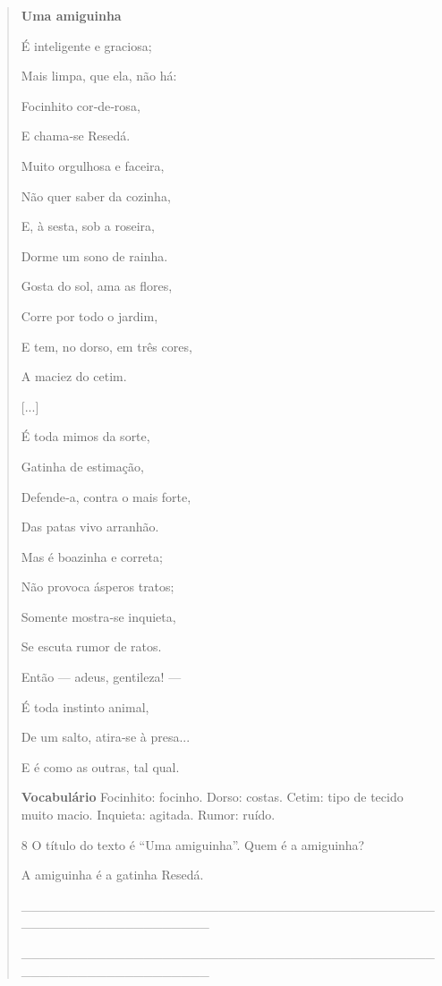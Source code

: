 \begin{boxlist}
{{\begin{quote}
\textbf{Uma amiguinha}

É inteligente e graciosa;

Mais limpa, que ela, não há:

Focinhito cor‑de‑rosa,

E chama‑se Resedá.


Muito orgulhosa e faceira,

Não quer saber da cozinha,

E, à sesta, sob a roseira,

Dorme um sono de rainha.


Gosta do sol, ama as flores,

Corre por todo o jardim,

E tem, no dorso, em três cores,

A maciez do cetim.


{[}...{]}


É toda mimos da sorte,

Gatinha de estimação,

Defende‑a, contra o mais forte,

Das patas vivo arranhão.


Mas é boazinha e correta;

Não provoca ásperos tratos;

Somente mostra‑se inquieta,

Se escuta rumor de ratos.
 

Então --- adeus, gentileza! ---

É toda instinto animal,

De um salto, atira‑se à presa...

E é como as outras, tal qual.


\textbf{Vocabulário}
Focinhito: focinho.
Dorso: costas.
Cetim: tipo de tecido muito macio.
Inquieta: agitada.
Rumor: ruído.

\num{8} O título do texto é ``Uma amiguinha''. Quem é a amiguinha?

A amiguinha é a gatinha Resedá.

\_\_\_\_\_\_\_\_\_\_\_\_\_\_\_\_\_\_\_\_\_\_\_\_\_\_\_\_\_\_\_\_\_\_\_\_\_\_\_\_\_\_\_\_\_\_\_\_\_\_\_\_\_\_\_\_\_\_\_\_\_\_\_\_

\_\_\_\_\_\_\_\_\_\_\_\_\_\_\_\_\_\_\_\_\_\_\_\_\_\_\_\_\_\_\_\_\_\_\_\_\_\_\_\_\_\_\_\_\_\_\_\_\_\_\_\_\_\_\_\_\_\_\_\_\_\_\_\_


\end{quote}}}
\end{boxlist}
